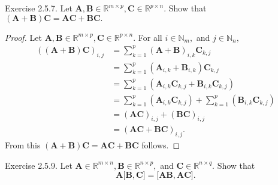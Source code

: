 \documentclass{article}
\theoremstyle{plain}
\begin{document}
\begin{itembox}[l]{Exercise 2.5.7.}
	Let
	\begin{math}
		\bm{A} , \bm{B} \in \mathbb{R}^{m \times p} , \bm{C} \in \mathbb{R}^{p \times n} .
	\end{math}
	Show that
	\begin{math}
		(\bm{A} + \bm{B}) \bm{C} = \bm{AC} + \bm{BC} .
	\end{math}
\end{itembox}

\begin{proof}
	Let
	\begin{math}
		\bm{A} , \bm{B} \in \mathbb{R}^{m \times p} , \bm{C} \in \mathbb{R}^{p \times n} .
	\end{math}
	For all
	\begin{math}
		i \in \mathbb{N}_m ,
	\end{math}
	and
	\begin{math}
		j \in \mathbb{N}_n ,
	\end{math}
	\begin{equation*}
		\begin{split}
			((\bm{A} + \bm{B}) \bm{C})_{i,j} &= \sum_{k=1}^p (\bm{A} + \bm{B})_{i,k} \bm{C}_{k,j} \\
			&= \sum_{k=1}^p (\bm{A}_{i,k} + \bm{B}_{i,k}) \bm{C}_{k,j} \\
			&= \sum_{k=1}^p (\bm{A}_{i,k} \bm{C}_{k,j} + \bm{B}_{i,k} \bm{C}_{k,j}) \\
			&= \sum_{k=1}^p (\bm{A}_{i,k} \bm{C}_{k,j}) + \sum_{k=1}^p (\bm{B}_{i,k} \bm{C}_{k,j}) \\
			&= (\bm{A} \bm{C})_{i,j} + (\bm{B} \bm{C})_{i,j} \\
			&= (\bm{A} \bm{C} + \bm{B} \bm{C})_{i,j} .
		\end{split}
	\end{equation*}
	From this $(\bm{A} + \bm{B}) \bm{C} = \bm{AC} + \bm{BC}$ follows.
\end{proof}

\begin{itembox}[l]{Exercise 2.5.9.}
	Let
	\begin{math}
		\bm{A} \in \mathbb{R}^{m \times n} , \bm{B} \in \mathbb{R}^{n \times p} ,
	\end{math}
	and
	\begin{math}
		\bm{C} \in \mathbb{R}^{n \times q} .
	\end{math}
	Show that
	\begin{equation}
		\bm{A} \lbrack \bm{B} , \bm{C} \rbrack = \lbrack \bm{AB} , \bm{AC} \rbrack .
	\end{equation}
\end{itembox}
\end{document}
